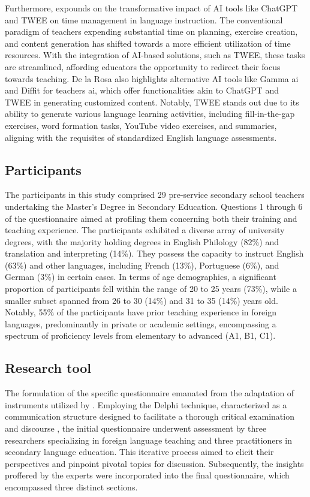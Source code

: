 Furthermore, \textcite[p.~101]{delarosa2023} expounds on the transformative
impact of AI tools like ChatGPT and TWEE on time management in language
instruction. The conventional paradigm of teachers expending substantial
time on planning, exercise creation, and content generation has shifted
towards a more efficient utilization of time resources. With the
integration of AI-based solutions, such as TWEE, these tasks are
streamlined, affording educators the opportunity to redirect their focus
towards teaching. De la Rosa also highlights alternative AI tools like
Gamma ai and Diffit for teachers ai, which offer functionalities akin to
ChatGPT and TWEE in generating customized content. Notably, TWEE stands
out due to its ability to generate various language learning activities,
including fill-in-the-gap exercises, word formation tasks, YouTube video
exercises, and summaries, aligning with the requisites of standardized
English language assessments.

\subsection{Participants}\label{sub-sec-participants}

The participants in this study comprised 29 pre-service secondary school
teachers undertaking the Master's Degree in Secondary Education.
Questions 1 through 6 of the questionnaire aimed at profiling them
concerning both their training and teaching experience. The participants
exhibited a diverse array of university degrees, with the majority
holding degrees in English Philology (82\%) and translation and
interpreting (14\%). They possess the capacity to instruct English
(63\%) and other languages, including French (13\%), Portuguese (6\%),
and German (3\%) in certain cases. In terms of age demographics, a
significant proportion of participants fell within the range of 20 to 25
years (73\%), while a smaller subset spanned from 26 to 30 (14\%) and 31
to 35 (14\%) years old. Notably, 55\% of the participants have prior
teaching experience in foreign languages, predominantly in private or
academic settings, encompassing a spectrum of proficiency levels from
elementary to advanced (A1, B1, C1).

\subsection{Research tool}\label{sub-sec-researchtool}

The formulation of the specific questionnaire emanated from the
adaptation of instruments utilized by \textcite{fernandezcostales2021}. Employing the Delphi technique, characterized as a
communication structure designed to facilitate a thorough critical
examination and discourse \cite{green2014}, the initial questionnaire
underwent assessment by three researchers specializing in foreign
language teaching and three practitioners in secondary language
education. This iterative process aimed to elicit their perspectives and
pinpoint pivotal topics for discussion. Subsequently, the insights
proffered by the experts were incorporated into the final questionnaire,
which encompassed three distinct sections.

